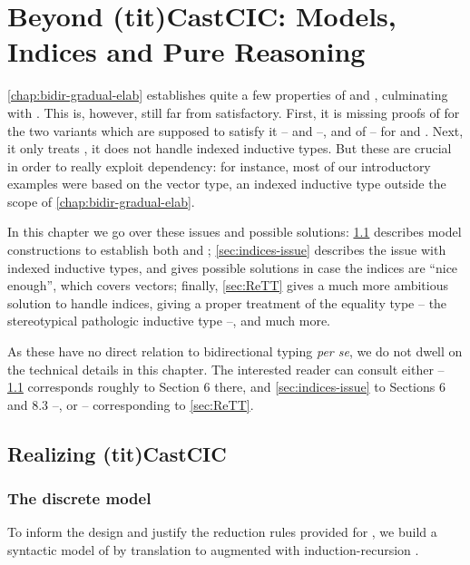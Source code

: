 \chapter{Beyond \kl(tit){CastCIC}: Models, Indices and Pure Reasoning}
\label{chap:beyond-gcic}

\cref{chap:bidir-gradual-elab} establishes quite a few properties of  and
, culminating with . This is, however, still far
from satisfactory. First, it is missing proofs of  for the two variants
which are supposed to satisfy it –  and  –, and of  – for
 and .
Next, it only treats , \ie it does not handle indexed inductive types.
But these are crucial in order to really exploit dependency:
for instance, most of our introductory examples were based on the vector type, an indexed
inductive type outside the scope of \cref{chap:bidir-gradual-elab}.

In this chapter we go over these issues and possible solutions:
\cref{sec:realizing-cast-calculus} describes model constructions to establish
both  and ;
\cref{sec:indices-issue} describes the issue with indexed inductive types, and gives
possible solutions in case the indices are “nice enough”, which covers vectors; finally,
\cref{sec:ReTT} gives a much more ambitious solution to handle indices, giving a proper
treatment of the equality type – the stereotypical pathologic inductive type –, and much more.

As these have no direct relation to bidirectional typing \textit{per se},
we do not dwell on the technical details in this chapter.
The interested reader can consult either  –
\cref{sec:realizing-cast-calculus} corresponds roughly to
Section 6 there, and \cref{sec:indices-issue} to Sections 6 and 8.3 –, or
 – corresponding to \cref{sec:ReTT}.

\section{Realizing \kl(tit){CastCIC}}
\label{sec:realizing-cast-calculus}

\subsection{The discrete model}

To inform the design and justify the reduction rules provided for
, we build a syntactic model%
%
%
of  by translation to 
augmented with induction-recursion
.

